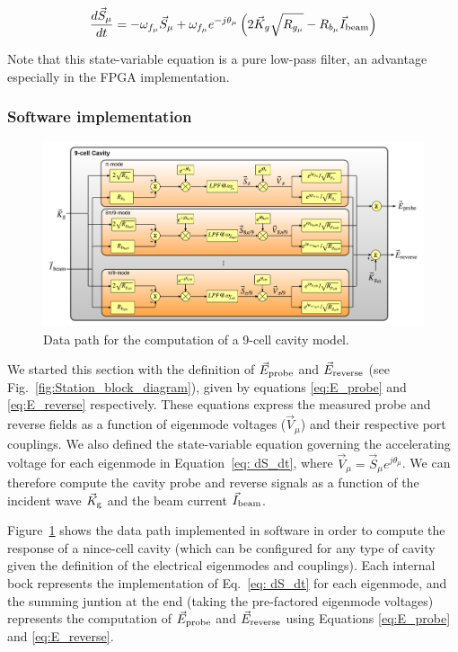\documentclass[a4paper,12pt]{article}
\begin{document}
\begin{equation}
  \frac{d\vec{S}_{\mu}}{dt} = -\omega_{f_{\mu}}\vec{S}_{\mu} + \omega_{f_{\mu}}e^{-j\theta_{\mu}}\left(2\vec{K}_g\sqrt{R_{g_{\mu}}} 
    - R_{b_{\mu}}\vec{I}_{\rm beam} \right)
\label{eq: dS_dt}
\end{equation}

Note that this state-variable equation is a pure low-pass filter, an advantage especially in the FPGA implementation.

\subsubsection{Software implementation}

\begin{figure}
\centering
\includegraphics[scale=0.4]{../figures/Cavity_modes.png}
\caption{Data path for the computation of a 9-cell cavity model.}
\label{fig:RF_cavity_block_diagram}
\end{figure}

We started this section with the definition of $\vec E_{\rm probe}$ and $\vec E_{\rm reverse}$ (see Fig.~\ref{fig:Station_block_diagram}), given by equations \ref{eq:E_probe} and \ref{eq:E_reverse} respectively. These equations express the measured probe and reverse fields as a function of eigenmode voltages ($\vec V_\mu$) and their respective port couplings. We also defined the state-variable equation governing the accelerating voltage for each eigenmode in Equation~\ref{eq: dS_dt}, where $\vec{V}_{\mu} = \vec{S}_{\mu}e^{j\theta_{\mu}}$. We can therefore compute the cavity probe and reverse signals as a function of the incident wave $\vec K_{\rm g}$ and the beam current $\vec I_{\rm beam}$.

Figure~\ref{fig:RF_cavity_block_diagram} shows the data path implemented in software in order to compute the response of a nince-cell cavity (which can be configured for any type of cavity given the definition of the electrical eigenmodes and couplings). Each internal bock represents the implementation of Eq.~\ref{eq: dS_dt} for each eigenmode, and the summing juntion at the end (taking the pre-factored eigenmode voltages) represents the computation of $\vec E_{\rm probe}$ and $\vec E_{\rm reverse}$ using Equations \ref{eq:E_probe} and \ref{eq:E_reverse}.
\end{document}
